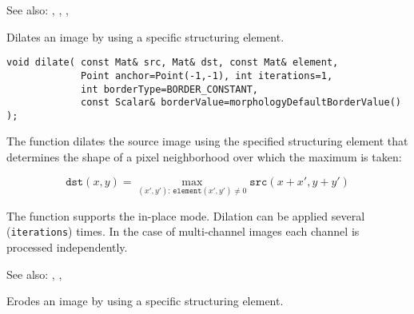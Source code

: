 See also: , , , 


Dilates an image by using a specific structuring element.

\begin{lstlisting}
void dilate( const Mat& src, Mat& dst, const Mat& element,
             Point anchor=Point(-1,-1), int iterations=1,
             int borderType=BORDER_CONSTANT,
             const Scalar& borderValue=morphologyDefaultBorderValue() );
\end{lstlisting}
\begin{description}
\end{description}

The function dilates the source image using the specified structuring element that determines the shape of a pixel neighborhood over which the maximum is taken:

\[
\texttt{dst}(x,y) = \max_{(x',y'): \, \texttt{element}(x',y')\ne0}\texttt{src}(x+x',y+y')
\]

The function supports the in-place mode. Dilation can be applied several (\texttt{iterations}) times. In the case of multi-channel images each channel is processed independently.

See also: , , 

Erodes an image by using a specific structuring element.


